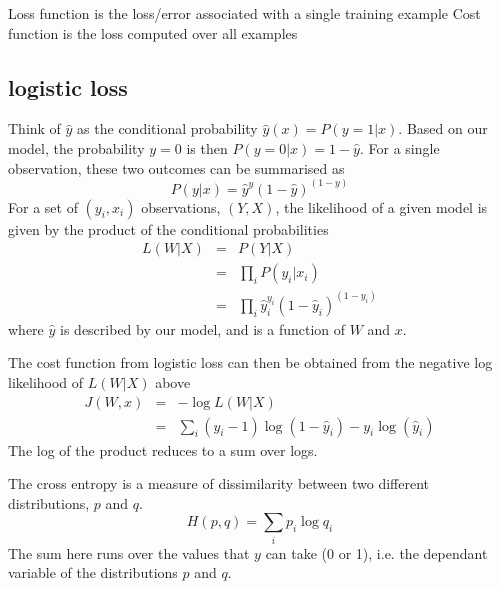 \documentclass{article}
\begin{document}
Loss function is the loss/error associated with a single training example
Cost function is the loss computed over all examples

\subsection{logistic loss}

Think of $\hat{y}$ as the conditional probability $\hat{y}(x) = P(y=1|x)$. Based on our model, the probability $y=0$ is then $P(y=0|x) = 1 - \hat{y}$. For a single observation, these two outcomes can be summarised as
\begin{equation}
P(y|x) = \hat{y}^y(1-\hat{y})^{(1-y)}
\end{equation}
For a set of $(y_i,x_i)$ observations, $(Y,X)$, the likelihood of a given model is given by the product of the conditional probabilities
\begin{eqnarray*}
L(W|X) & = & P(Y|X) \\
& = & \prod_i P(y_i|x_i) \\
& = & \prod_i \hat{y}_i^{y_i}(1-\hat{y}_i)^{(1-y_i)}
\end{eqnarray*}
where $\hat{y}$ is described by our model, and is a function of $W$ and $x$.

The cost function from logistic loss can then be obtained from the negative log likelihood of $L(W|X)$ above
\begin{eqnarray*}
J(W,x) & = & - \log L(W|X) \\
 & = & \sum_i  (y_i-1) \log(1 - \hat{y}_i) - y_i \log(\hat{y}_i)
\end{eqnarray*}
The log of the product reduces to a sum over logs.

The cross entropy is a measure of dissimilarity between two different distributions, $p$ and $q$. 
\begin{equation}
H(p,q) = \sum_i p_i \log q_i
\end{equation}
The sum here runs over the values that $y$ can take (0 or 1), i.e. the dependant variable of the distributions $p$ and $q$. 
\end{document}
